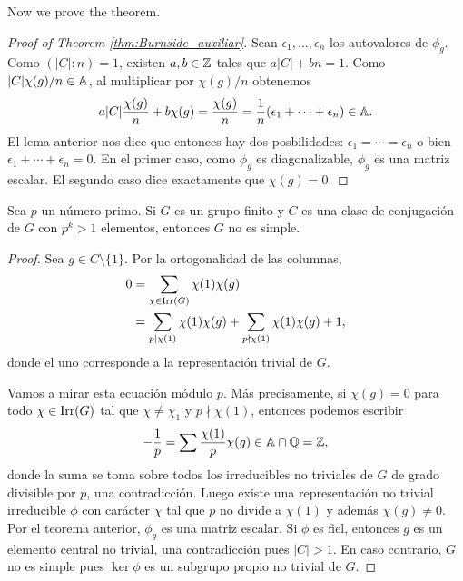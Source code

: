 Now we prove the theorem.

\begin{proof}[Proof of Theorem \ref{thm:Burnside_auxiliar}]
	Sean $\epsilon_1,\dots,\epsilon_n$ los autovalores de $\phi_g$. Como
	$(|C|:n)=1$, existen $a,b\in\mathbb{Z}$ tales que $a|C|+bn=1$.  Como
	$|C|\chi(g)/n\in\mathbb{A}$, al multiplicar por $\chi(g)/n$ obtenemos 
	\[
		a|C|\frac{\chi(g)}{n}+b\chi(g)=\frac{\chi(g)}{n}=\frac{1}{n}(\epsilon_1+\cdots+\epsilon_n)\in\mathbb{A}.
	\]
	El lema anterior nos dice que entonces hay dos posbilidades:
	$\epsilon_1=\cdots=\epsilon_n$ o bien $\epsilon_1+\cdots+\epsilon_n=0$. En
	el primer caso, como $\phi_g$ es diagonalizable, $\phi_g$ es una matriz
	escalar. El segundo caso dice exactamente que $\chi(g)=0$.
\end{proof}

\begin{theorem}[Burnside]
  Sea $p$ un número primo. Si $G$ es un grupo finito y $C$ es una clase de
  conjugación de $G$ con $p^k>1$ elementos, entonces $G$ no es simple.
\end{theorem}

\begin{proof}
	Sea $g\in C\setminus\{1\}$. Por la ortogonalidad de las columnas, 
	\begin{equation}
	\label{eq:Burnside}
	\begin{aligned}
		0&=\sum_{\chi\in\operatorname{Irr}(G)}\chi(1)\chi(g)\\
		&=\sum_{p\mid\chi(1)}\chi(1)\chi(g)+\sum_{p\nmid\chi(1)}\chi(1)\chi(g)+1,
	\end{aligned}
	\end{equation}
	donde el uno corresponde a la representación trivial de $G$. 
	
	Vamos a mirar esta ecuación módulo $p$. Más precisamente, si $\chi(g)=0$ para todo $\chi\in\operatorname{Irr}(G)$
	tal que $\chi\ne\chi_1$ y $p\nmid\chi(1)$, entonces
	podemos escribir
	\[
	-\frac{1}{p}=\sum\frac{\chi(1)}{p}\chi(g)\in\mathbb{A}\cap\mathbb{Q}=\mathbb{Z},
	\]
	donde la suma se toma sobre todos los irreducibles no triviales de $G$ de grado divisible por $p$, 
	una contradicción. Luego existe una representación no
	trivial irreducible $\phi$ con carácter $\chi$ tal que $p$ no divide a
	$\chi(1)$ y además $\chi(g)\ne0$. Por el teorema anterior, $\phi_g$ es una
	matriz escalar. Si $\phi$ es fiel, entonces $g$ es un elemento central no
	trivial, una contradicción pues $|C|>1$. En caso contrario, $G$ no es simple pues
	$\ker\phi$ es un subgrupo propio no trivial de $G$.
\end{proof}

